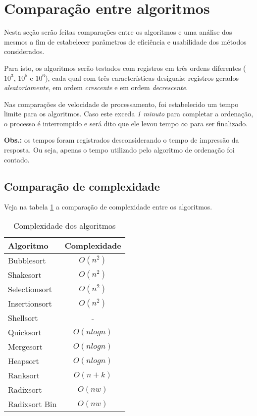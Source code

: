 \documentclass[
	11pt,
	oneside,
	a4paper,
	english,
	brazil,
	]{article}
\begin{document}
\section{Comparação entre algoritmos}
Nesta seção serão feitas comparações entre os algoritmos e uma análise dos
mesmos a fim de estabelecer parâmetros de eficiência e usabilidade dos métodos
considerados.

Para isto, os algoritmos serão testados com registros em três ordens
diferentes ($10^3$, $10^5$ e $10^6$), cada qual com três características
desiguais: registros gerados \textit{aleatoriamente}, em ordem
\textit{crescente} e em ordem \textit{decrescente}.

Nas comparações de velocidade de processamento, foi estabelecido um tempo
limite para os algoritmos. Caso este exceda \textit{1 minuto} para completar a
ordenação, o processo é interrompido e será dito que ele levou tempo
$\infty$ para ser finalizado.

\textbf{Obs.:} os tempos foram registrados desconsiderando o tempo de impressão
da resposta. Ou seja, apenas o tempo utilizado pelo algoritmo de ordenação foi 
contado.

\subsection{Comparação de complexidade}
Veja na tabela \ref{tab:cmplx} a comparação de complexidade entre os
algoritmos.

\begin{table}[ht]
\centering
\begin{tabular}{lc}
\hline 
\textbf{Algoritmo} & \textbf{Complexidade} \\
\hline
Bubblesort   	& $ O(n^2) $  	 \\ 
Shakesort  		& $ O(n^2) $  	 \\ 
Selectionsort	& $ O(n^2) $  	 \\
Insertionsort  	& $ O(n^2) $  	 \\
Shellsort 		& - 			 \\
Quicksort 		& $ O(n log n) $ \\
Mergesort 		& $ O(n log n) $ \\
Heapsort 		& $ O(n log n) $ \\
Ranksort 		& $ O(n + k) $ 	 \\
Radixsort 		& $ O(nw) $ 	 \\
Radixsort Bin 	& $ O(nw) $ 	 \\
\hline
\end{tabular}
\caption{Complexidade dos algoritmos}
\label{tab:cmplx}
\end{table}
\end{document}
